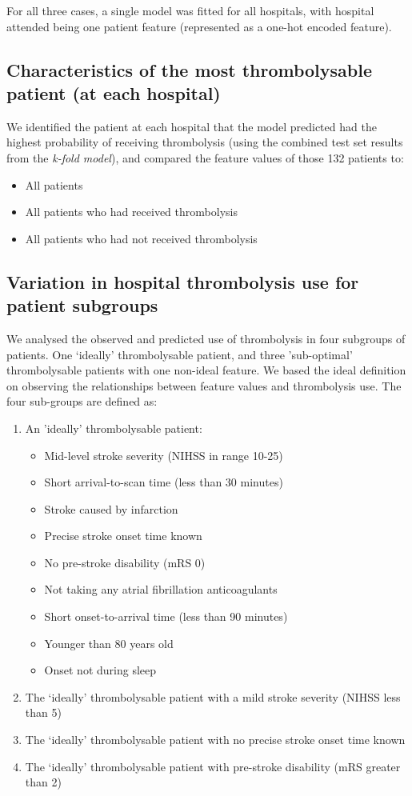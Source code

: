For all three cases, a single model was fitted for all hospitals, with hospital attended being one patient feature (represented as a one-hot encoded feature).

\subsection{Characteristics of the most thrombolysable patient (at each hospital)}
We identified the patient at each hospital that the model predicted had the highest probability of receiving thrombolysis (using the combined test set results from the \emph{k-fold model}), and compared the feature values of those 132 patients to:
\begin{itemize}
\item All patients
\item All patients who had received thrombolysis
\item All patients who had not received thrombolysis
\end{itemize}
\iffalse
\subsection{Variation in hospital thrombolysis use for patient subgroups}

We analysed the observed and predicted use of thrombolysis in four subgroups of patients. One `ideally' thrombolysable patient, and three 'sub-optimal' thrombolysable patients with one non-ideal feature. We based the ideal definition on observing the relationships between feature values and thrombolysis use. The four sub-groups are defined as:

\begin{enumerate}
  \item An 'ideally' thrombolysable patient:
  \begin{itemize}
    \item Mid-level stroke severity (NIHSS in range 10-25)
    \item Short arrival-to-scan time (less than 30 minutes)
    \item Stroke caused by infarction
    \item Precise stroke onset time known
    \item No pre-stroke disability (mRS 0)
    \item Not taking any atrial fibrillation anticoagulants
    \item Short onset-to-arrival time (less than 90 minutes)
    \item Younger than 80 years old
    \item Onset not during sleep
  \end{itemize}
  \item The `ideally' thrombolysable patient with a mild stroke severity (NIHSS less than 5)
  \item The `ideally' thrombolysable patient with no precise stroke onset time known
  \item The `ideally' thrombolysable patient with pre-stroke disability (mRS greater than 2)
\end{enumerate}

